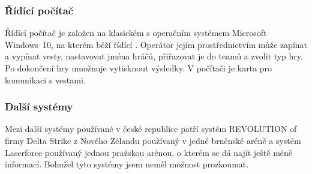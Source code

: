 \subsubsection{Řídící počítač}
Řídící počítač je založen na klasickém  s operačním systémem Microsoft Windows~10, na kterém běží řídící . Operátor jejím prostřednictvím může zapínat a vypínat vesty, nastavovat jména hráčů, přiřazovat je do teamů a zvolit typ hry. Po dokončení hry umožnuje  vytisknout výsledky. V počítači je  karta pro komunikaci s vestami.


\subsubsection{Další systémy}
Mezi další systémy používané v české republice patří systém REVOLUTION of firmy Delta Strike z Nového Zélandu používaný v jedné brněnské aréně a systém Laserforce používaný jednou pražskou arénou, o kterém se dá najít ještě méně informací. Bohužel tyto systémy jsem neměl možnost prozkoumat.

